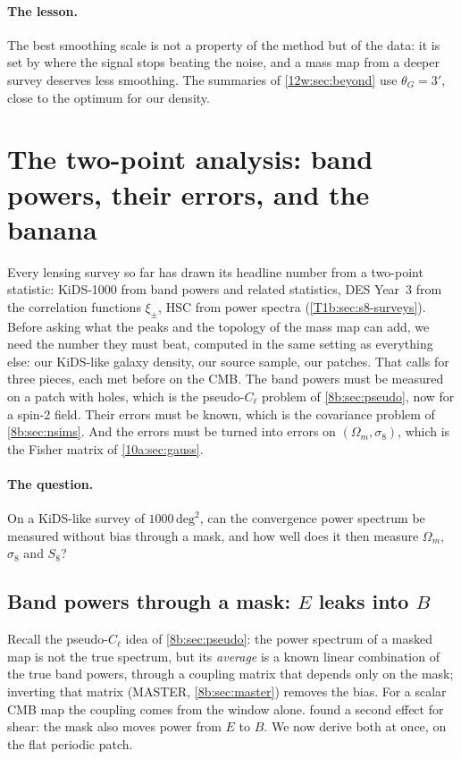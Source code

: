 \paragraph{The lesson.} The best smoothing scale is not a property of the method but of the data: it is set by
where the signal stops beating the noise, and a mass map from a deeper survey deserves less smoothing. The summaries
of \cref{12w:sec:beyond} use $\theta_G=3'$, close to the optimum for our density.
\section{The two-point analysis: band powers, their errors, and the banana}
\label{12w:sec:twopoint}

Every lensing survey so far has drawn its headline number from a two-point statistic: KiDS-1000 from band powers
and related statistics, DES Year~3 from the correlation functions $\xi_\pm$, HSC from power spectra
(\cref{T1b:sec:s8-surveys}). Before asking what the peaks and the topology of the mass map can add, we need the
number they must beat, computed in the same setting as everything else: our KiDS-like galaxy density, our source
sample, our patches. That calls for three pieces, each met before on the CMB. The band powers must be measured on a
patch with holes, which is the pseudo-$C_\ell$ problem of \cref{8b:sec:pseudo}, now for a spin-2 field. Their
errors must be known, which is the covariance problem of \cref{8b:sec:nsims}. And the errors must be turned into
errors on $(\Omega_m,\sigma_8)$, which is the Fisher matrix of \cref{10a:sec:gauss}.

\paragraph{The question.} On a KiDS-like survey of $1000\,\mathrm{deg}^2$, can the convergence power spectrum be
measured without bias through a mask, and how well does it then measure $\Omega_m$, $\sigma_8$ and $S_8$?

\subsection{Band powers through a mask: \texorpdfstring{$E$}{E} leaks into \texorpdfstring{$B$}{B}}
\label{12w:sec:pcl}

Recall the pseudo-$C_\ell$ idea of \cref{8b:sec:pseudo}: the power spectrum of a masked map is not the true
spectrum, but its \emph{average} is a known linear combination of the true band powers, through a coupling matrix
that depends only on the mask; inverting that matrix (MASTER, \cref{8b:sec:master}) removes the bias. For a scalar
CMB map the coupling comes from the window alone.  found a second effect for shear: the
mask also moves power from $E$ to $B$. We now derive both at once, on the flat periodic patch.

